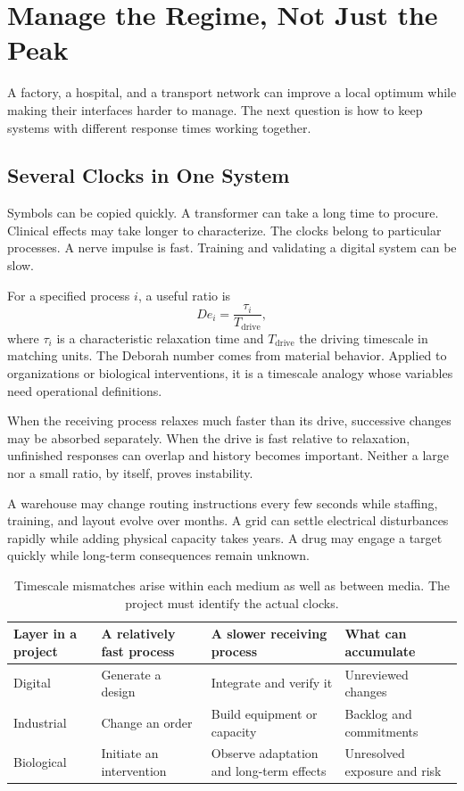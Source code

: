 \documentclass[11pt,openany]{book}
\begin{document}
\section{Manage the Regime, Not Just the Peak}

A factory, a hospital, and a transport network can improve a local optimum while making their interfaces harder to manage. The next question is how to keep systems with different response times working together.

\subsection{Several Clocks in One System}

Symbols can be copied quickly. A transformer can take a long time to procure. Clinical effects may take longer to characterize. The clocks belong to particular processes. A nerve impulse is fast. Training and validating a digital system can be slow.

For a specified process $i$, a useful ratio is
\begin{equation}
 De_i=\frac{\tau_i}{T_{\mathrm{drive}}},
\end{equation}
where $\tau_i$ is a characteristic relaxation time and $T_{\mathrm{drive}}$ the driving timescale in matching units. The Deborah number comes from material behavior. Applied to organizations or biological interventions, it is a timescale analogy whose variables need operational definitions.

When the receiving process relaxes much faster than its drive, successive changes may be absorbed separately. When the drive is fast relative to relaxation, unfinished responses can overlap and history becomes important. Neither a large nor a small ratio, by itself, proves instability.

A warehouse may change routing instructions every few seconds while staffing, training, and layout evolve over months. A grid can settle electrical disturbances rapidly while adding physical capacity takes years. A drug may engage a target quickly while long-term consequences remain unknown.

\begin{table}[ht]
\centering\small
\begin{tabularx}{\textwidth}{@{}lYYY@{}}
\toprule
Layer in a project & A relatively fast process & A slower receiving process & What can accumulate\\
\midrule
Digital & Generate a design & Integrate and verify it & Unreviewed changes\\
Industrial & Change an order & Build equipment or capacity & Backlog and commitments\\
Biological & Initiate an intervention & Observe adaptation and long-term effects & Unresolved exposure and risk\\
\bottomrule
\end{tabularx}
\caption{Timescale mismatches arise within each medium as well as between media. The project must identify the actual clocks.}
\end{table}
\end{document}

